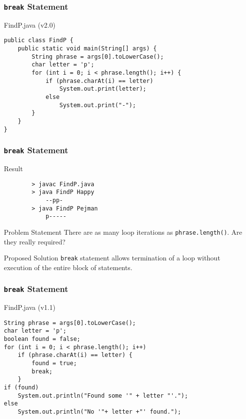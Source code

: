 \documentclass[10pt, compress]{beamer}
\begin{document}
\begin{frame}[fragile]
	\frametitle{\texttt{break} Statement}
	\begin{block}{FindP.java (v2.0)}
		\begin{verbatim}
public class FindP {
	public static void main(String[] args) {
		String phrase = args[0].toLowerCase();
		char letter = 'p';
		for (int i = 0; i < phrase.length(); i++) {
			if (phrase.charAt(i) == letter)
				System.out.print(letter);
			else
				System.out.print("-");
		}
	}
}
		\end{verbatim}
	\end{block}
\end{frame}

\begin{frame}[fragile]
	\frametitle{\texttt{break} Statement}
	\begin{block}{Result}
		\begin{verbatim}
		> javac FindP.java
		> java FindP Happy
			--pp-
		> java FindP Pejman
			p-----
		\end{verbatim}
	\end{block}
	\begin{block}{Problem Statement}
		There are as many loop iterations as \texttt{phrase.length()}. Are they really required?
	\end{block}
	\begin{block}{Proposed Solution}
		\texttt{break} statement allows termination of a loop without execution of the entire block of statements.
	\end{block}
\end{frame}


\begin{frame}[fragile]
	\frametitle{\texttt{break} Statement}
	\begin{block}{FindP.java (v1.1)}
		\begin{verbatim}
String phrase = args[0].toLowerCase();
char letter = 'p';
boolean found = false;
for (int i = 0; i < phrase.length(); i++)
	if (phrase.charAt(i) == letter) {
		found = true;
		break;
	}
if (found)
	System.out.println("Found some '" + letter "'.");
else
	System.out.println("No '"+ letter +"' found.");
		\end{verbatim}
	\end{block}
\end{frame}
\end{document}
